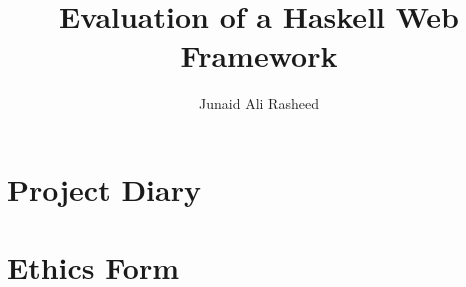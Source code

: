 \documentclass[a4paper,11pt,parskip,abstract=on,thesis,DIV=9]{scrreprt}
\title{Evaluation of a Haskell Web Framework}
\author{Junaid Ali Rasheed}
\begin{document}


\maketitle



\tableofcontents
\listoffigures

\begin{abstract}
\lipsum[1-3]
\end{abstract}









\printbibliography[heading=bibintoc,title={References}]

\begin{refsection}
\nocite{*}
\printbibliography[heading=bibintoc,title={Bibliography}]  
\end{refsection}

\begin{appendices}

\chapter{Project Diary}


\chapter{Ethics Form}


\end{appendices}
\end{document}
